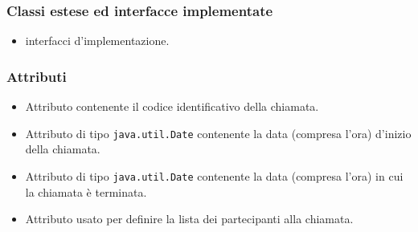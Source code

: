\subsubsection*{Classi estese ed interfacce implementate}
\begin{itemize}
	\item {} interfacci d'implementazione.
\end{itemize}

\subsubsection*{Attributi}

\begin{itemize}
	\item{}
	Attributo contenente il codice identificativo della chiamata.
	\item{}
	Attributo di tipo \texttt{java.util.Date} contenente la data (compresa l'ora) d'inizio della chiamata.
	\item{}
	Attributo di tipo \texttt{java.util.Date} contenente la data (compresa l'ora) in cui la chiamata è terminata.
	\item{}
	Attributo usato per definire la lista dei partecipanti alla chiamata.
\end{itemize}


